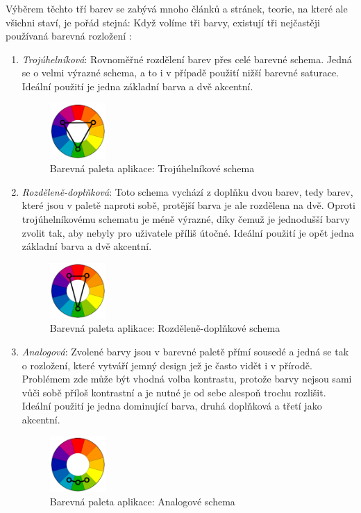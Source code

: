 Výběrem těchto tří barev se zabývá mnoho článků a stránek, teorie, na které ale všichni staví, je pořád stejná: Když volíme tři barvy, existují tři nejčastěji používaná barevná rozložení \cite{color-scheme-pick}:

\begin{enumerate}
    \item \emph{Trojúhelníková}: Rovnoměřné rozdělení barev přes celé barevné schema. Jedná se o velmi výrazné schema, a to i v případě použití nižší barevné saturace. Ideální použití je jedna základní barva a dvě akcentní.
    \begin{figure}[H]
        \includegraphics[width=0.2\textwidth]{../png/colors/Triad.png}
        \caption{Barevná paleta aplikace: Trojúhelníkové schema} \label{picture:colors:analog}
    \end{figure}
    \item \emph{Rozděleně-doplňková}: Toto schema vychází z doplňku dvou barev, tedy barev, které jsou v paletě naproti sobě, protější barva je ale rozdělena na dvě. Oproti trojúhelníkovému schematu je méně výrazné, díky čemuž je jednodušší barvy zvolit tak, aby nebyly pro uživatele příliš útočné. Ideální použití je opět jedna základní barva a dvě akcentní.
    \begin{figure}[H]
        \includegraphics[width=0.2\textwidth]{../png/colors/SplitComplementary.png}
        \caption{Barevná paleta aplikace: Rozděleně-doplňkové schema} \label{picture:colors:splitCom}
    \end{figure}
    \item \emph{Analogová}: Zvolené barvy jsou v barevné paletě přímí sousedé a jedná se tak o  rozložení, které vytváří jemný design jež je často vidět i v přírodě. Problémem zde může být vhodná volba kontrastu, protože barvy nejsou sami vůči sobě příloš kontrastní a je nutné je od sebe alespoň trochu rozlišit. Ideální použití je jedna dominující barva, druhá doplňková a třetí jako akcentní.
    \begin{figure}[H]
        \includegraphics[width=0.2\textwidth]{../png/colors/Analogous.png}
        \caption{Barevná paleta aplikace: Analogové schema} \label{picture:colors:triad}
    \end{figure}
\end{enumerate}

